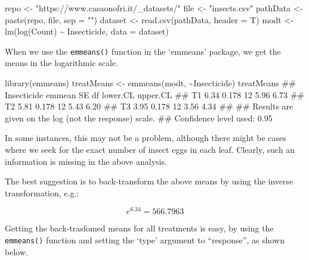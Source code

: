 \documentclass[a4paper,12pt,oneside]{book}
\newenvironment{Shaded}{\begin{snugshade}}{\end{snugshade}}
\newcommand{\SpecialCharTok}[1]{#1}
\newcommand{\StringTok}[1]{#1}
\newcommand{\DocumentationTok}[1]{#1}
\newcommand{\OtherTok}[1]{#1}
\newcommand{\FunctionTok}[1]{#1}
\newcommand{\AttributeTok}[1]{#1}
\newcommand{\NormalTok}[1]{#1}
\begin{document}
\begin{Shaded}
\begin{Highlighting}[]
\NormalTok{repo }\OtherTok{\textless{}{-}} \StringTok{"https://www.casaonofri.it/\_datasets/"}
\NormalTok{file }\OtherTok{\textless{}{-}} \StringTok{"insects.csv"}
\NormalTok{pathData }\OtherTok{\textless{}{-}} \FunctionTok{paste}\NormalTok{(repo, file, }\AttributeTok{sep =} \StringTok{""}\NormalTok{)}
\NormalTok{dataset }\OtherTok{\textless{}{-}} \FunctionTok{read.csv}\NormalTok{(pathData, }\AttributeTok{header =}\NormalTok{ T)}
\NormalTok{modt }\OtherTok{\textless{}{-}} \FunctionTok{lm}\NormalTok{(}\FunctionTok{log}\NormalTok{(Count) }\SpecialCharTok{\textasciitilde{}}\NormalTok{ Insecticide, }\AttributeTok{data =}\NormalTok{ dataset)}
\end{Highlighting}
\end{Shaded}

When we use the \texttt{emmeans()} function in the `emmeans' package, we get the means in the logarithmic scale.

\begin{Shaded}
\begin{Highlighting}[]
\FunctionTok{library}\NormalTok{(emmeans)}
\NormalTok{treatMeans }\OtherTok{\textless{}{-}} \FunctionTok{emmeans}\NormalTok{(modt, }\SpecialCharTok{\textasciitilde{}}\NormalTok{Insecticide)}
\NormalTok{treatMeans}
\DocumentationTok{\#\#  Insecticide emmean    SE df lower.CL upper.CL}
\DocumentationTok{\#\#  T1            6.34 0.178 12     5.96     6.73}
\DocumentationTok{\#\#  T2            5.81 0.178 12     5.43     6.20}
\DocumentationTok{\#\#  T3            3.95 0.178 12     3.56     4.34}
\DocumentationTok{\#\# }
\DocumentationTok{\#\# Results are given on the log (not the response) scale. }
\DocumentationTok{\#\# Confidence level used: 0.95}
\end{Highlighting}
\end{Shaded}

In some instances, this may not be a problem, although there might be cases where we seek for the exact number of insect eggs in each leaf. Clearly, such an information is missing in the above analysis.

The best suggestion is to back-transform the above means by using the inverse transformation, e.g.:

\[e^{6.34} = 566.7963\]

Getting the back-trasfomed means for all treatments is easy, by using the \texttt{emmeans()} function and setting the `type' argument to ``response'', as shown below.
\end{document}

